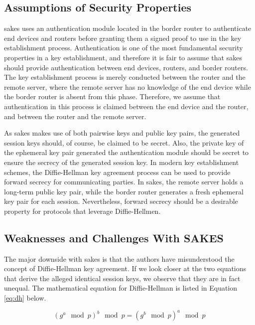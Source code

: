 \subsection{Assumptions of Security Properties}
\label{subsec:sakes-props}

\gls{sakes} uses an authentication module located in the border router to authenticate end devices and routers before granting them a signed proof to use in the key establishment process. Authentication is one of the most fundamental security properties in a key establishment, and therefore it is fair to assume that \gls{sakes} should provide authentication between end devices, routers, and border routers. The key establishment process is merely conducted between the router and the remote server, where the remote server has no knowledge of the end device while the border router is absent from this phase. Therefore, we assume that authentication in this process is claimed between the end device and the router, and between the router and the remote server.

As \gls{sakes} makes use of both pairwise keys and public key pairs, the generated session keys should, of course, be claimed to be secret. Also, the private key of the ephemeral key pair generated the authentication module should be secret to ensure the secrecy of the generated session key. In modern key establishment schemes, the Diffie-Hellman key agreement process can be used to provide forward secrecy for communicating parties. In \gls{sakes}, the remote server holds a long-term public key pair, while the border router generates a fresh ephemeral key pair for each session. Nevertheless, forward secrecy should be a desirable property for protocols that leverage Diffie-Hellmen. 


\subsection{Weaknesses and Challenges With SAKES}

The major downside with \gls{sakes} is that the authors have misunderstood the concept of Diffie-Hellman key agreement. If we look closer at the two equations that derive the alleged identical session keys, we observe that they are in fact unequal. The mathematical equation for Diffie-Hellman is listed in Equation \ref{eq:dh} below.

\begin{equation}
\label{eq:dh}
(g^a \mod p)^b \mod p = (g^b \mod p)^a \mod p
\end{equation}

